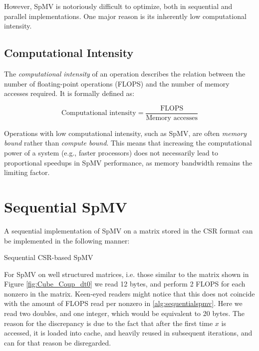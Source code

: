 However, SpMV is notoriously difficult to optimize, both in sequential and parallel implementations. One major reason is its inherently low computational intensity.

\subsection{Computational Intensity}

The \textit{computational intensity} of an operation describes the relation between the number of floating-point operations (FLOPS) and the number of memory accesses required. It is formally defined as:

\begin{equation}
    \text{Computational intensity} = \frac{\text{FLOPS}}{\text{Memory accesses}}
    \label{eq:computationaldensity}
\end{equation}

Operations with low computational intensity, such as SpMV, are often \textit{memory bound} rather than \textit{compute bound}. This means that increasing the computational power of a system (e.g., faster processors) does not necessarily lead to proportional speedups in SpMV performance, as memory bandwidth remains the limiting factor.

\section{Sequential SpMV}
A sequential implementation of SpMV on a matrix stored in the CSR format can be implemented in the following manner:
\medskip

\begin{algorithm}[htbp]
    \caption{Sequential CSR-based SpMV}
    \SetAlgoVlined

\end{algorithm}
\label{alg:sequentialspmv}
\medskip

For SpMV on well structured matrices, i.e. those similar to the matrix shown in Figure \ref{fig:Cube_Coup_dt0}  we read 12 bytes, and perform 2 FLOPS for each nonzero in the matrix. Keen-eyed readers might notice that this does not coincide with the amount of FLOPS read per nonzero in \autoref{alg:sequentialspmv}. Here we read two doubles, and one integer, which would be equivalent to 20 bytes. The reason for the discrepancy is due to the fact that after the first time \(x\) is accessed, it is loaded into cache, and heavily reused in subsequent iterations, and can for that reason be disregarded.

